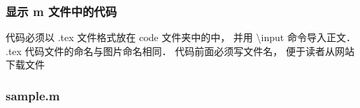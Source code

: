 \subsubsection{显示 m 文件中的代码}

代码必须以  .tex 文件格式放在 code 文件夹中的中， 并用 \textbackslash input 命令导入正文． .tex 代码文件的命名与图片命名相同． 代码前面必须写文件名， 便于读者从网站下载文件

\subsubsection{sample.m}




